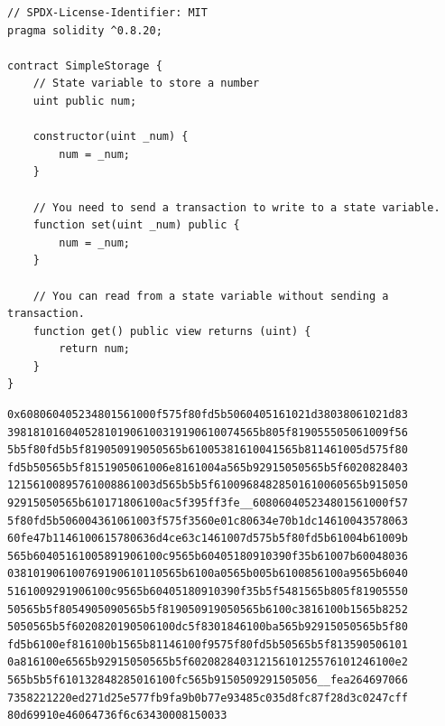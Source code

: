 \begin{lstlisting}[caption={Example of a simple Solidity smart contract that stores a variable on the blockchain and allows edits to it.},label={lst:solidity-example},captionpos=b, style=boxed]
// SPDX-License-Identifier: MIT
pragma solidity ^0.8.20;

contract SimpleStorage {
    // State variable to store a number
    uint public num;

    constructor(uint _num) {
        num = _num;
    }

    // You need to send a transaction to write to a state variable.
    function set(uint _num) public {
        num = _num;
    }

    // You can read from a state variable without sending a transaction.
    function get() public view returns (uint) {
        return num;
    }
}
\end{lstlisting}

\begin{lstlisting}[caption={EVM bytecode derived from compiling the contract shown in \cref{lst:solidity-example}. There are three parts divided by \_\_: the first part is the deployment code, the second part is the runtime code and the last part is the CBOR-endoded metadata. This is what is stored on the blockchain and what can be retrieved.},label={lst:solc-result},captionpos=b, style=boxed,breaklines]
0x608060405234801561000f575f80fd5b5060405161021d38038061021d83
398181016040528101906100319190610074565b805f819055505061009f56
5b5f80fd5b5f819050919050565b61005381610041565b811461005d575f80
fd5b50565b5f8151905061006e8161004a565b92915050565b5f6020828403
12156100895761008861003d565b5b5f61009684828501610060565b915050
92915050565b610171806100ac5f395ff3fe__608060405234801561000f57
5f80fd5b506004361061003f575f3560e01c80634e70b1dc14610043578063
60fe47b1146100615780636d4ce63c1461007d575b5f80fd5b61004b61009b
565b60405161005891906100c9565b60405180910390f35b61007b60048036
038101906100769190610110565b6100a0565b005b6100856100a9565b6040
5161009291906100c9565b60405180910390f35b5f5481565b805f81905550
50565b5f8054905090565b5f819050919050565b6100c3816100b1565b8252
5050565b5f6020820190506100dc5f8301846100ba565b92915050565b5f80
fd5b6100ef816100b1565b81146100f9575f80fd5b50565b5f813590506101
0a816100e6565b92915050565b5f60208284031215610125576101246100e2
565b5b5f610132848285016100fc565b9150509291505056__fea264697066
7358221220ed271d25e577fb9fa9b0b77e93485c035d8fc87f28d3c0247cff
80d69910e46064736f6c63430008150033
\end{lstlisting}

